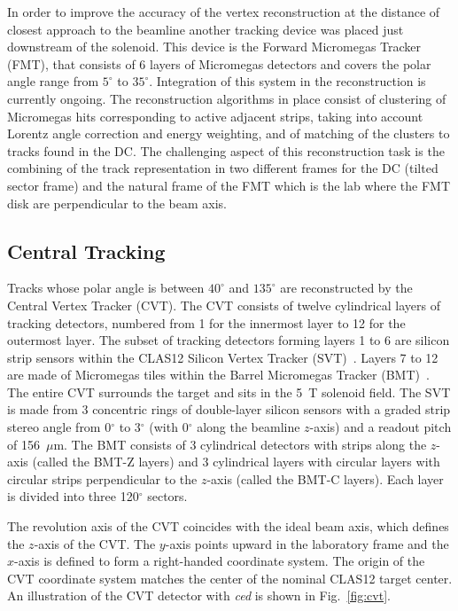 In order to improve the accuracy of the vertex reconstruction at the distance of closest approach to the beamline another tracking device was placed just downstream of the solenoid.  This device is the Forward
Micromegas Tracker (FMT), that consists of 6 layers of Micromegas detectors and covers the polar angle range
from $5^\circ$ to $35^\circ$.  Integration of this system in the reconstruction is currently ongoing. 
The reconstruction algorithms in place consist of clustering of Micromegas hits corresponding to active adjacent strips, taking into account Lorentz angle correction and energy weighting, and of matching of the clusters to tracks found in the DC.  The challenging aspect of this reconstruction task is the combining of the track representation in two different frames for the DC (tilted sector frame) and the natural frame of the FMT which is the lab where the FMT disk are perpendicular to the beam axis. 

\subsection{Central Tracking}
\label{sec:cvt}

Tracks whose polar angle is between $40^\circ$ and $135^\circ$ are reconstructed by the Central Vertex Tracker
(CVT). The CVT consists of twelve cylindrical layers of tracking detectors, numbered from 1 for the innermost layer
to 12 for the outermost layer. The subset of tracking detectors forming layers 1 to 6 are silicon strip sensors within
the CLAS12 Silicon Vertex Tracker (SVT)~\cite{svt-nim}. Layers 7 to 12 are made of Micromegas tiles within the
Barrel Micromegas Tracker (BMT)~\cite{mm-nim}. The entire CVT surrounds the target and sits in the 5~T solenoid
field. The SVT is made from 3 concentric rings of double-layer silicon sensors with a graded strip stereo angle from
0$^\circ$ to 3$^\circ$ (with 0$^\circ$ along the beamline $z$-axis) and a readout pitch of 156~$\mu$m. The BMT
consists of 3 cylindrical detectors with strips along the $z$-axis (called the BMT-Z layers) and 3 cylindrical layers
with circular layers with circular strips perpendicular to the $z$-axis (called the BMT-C layers). Each layer is divided
into three 120$^\circ$ sectors.

The revolution axis of the CVT coincides with the ideal beam axis, which defines the $z$-axis of the CVT. The
$y$-axis points upward in the laboratory frame and the $x$-axis is defined to form a right-handed coordinate
system. The origin of the CVT coordinate system matches the center of the nominal CLAS12 target center. An
illustration of the CVT detector with {\it ced} is shown in Fig.~\ref{fig:cvt}.

